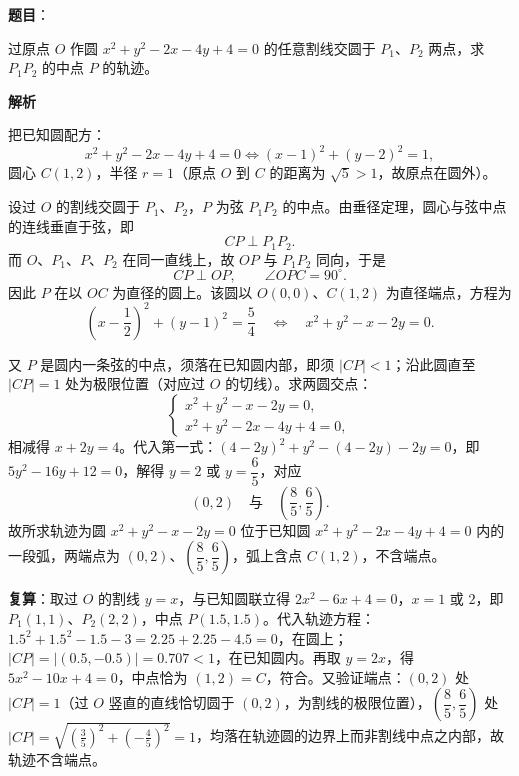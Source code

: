 \begin{answer}

\textbf{题目}：

过原点 $O$ 作圆 $x^2+y^2-2x-4y+4=0$ 的任意割线交圆于 $P_1$、$P_2$ 两点，求 $P_1P_2$ 的中点 $P$ 的轨迹。

\textbf{解析}

把已知圆配方：
\nopagebreak[4]
\[
x^2+y^2-2x-4y+4=0\iff (x-1)^2+(y-2)^2=1,
\]
圆心 $C(1,2)$，半径 $r=1$（原点 $O$ 到 $C$ 的距离为 $\sqrt5>1$，故原点在圆外）。

设过 $O$ 的割线交圆于 $P_1$、$P_2$，$P$ 为弦 $P_1P_2$ 的中点。由垂径定理，圆心与弦中点的连线垂直于弦，即
\nopagebreak[4]
\[
CP\perp P_1P_2 .
\]
而 $O$、$P_1$、$P$、$P_2$ 在同一直线上，故 $OP$ 与 $P_1P_2$ 同向，于是
\nopagebreak[4]
\[
CP\perp OP,\qquad \angle OPC=90^\circ .
\]
因此 $P$ 在以 $OC$ 为直径的圆上。该圆以 $O(0,0)$、$C(1,2)$ 为直径端点，方程为
\nopagebreak[4]
\[
\left(x-\frac12\right)^2+(y-1)^2=\frac54
\quad\iff\quad x^2+y^2-x-2y=0 .
\]

又 $P$ 是圆内一条弦的中点，须落在已知圆内部，即须 $|CP|<1$；沿此圆直至 $|CP|=1$ 处为极限位置（对应过 $O$ 的切线）。求两圆交点：
\nopagebreak[4]
\[
\begin{cases}
x^2+y^2-x-2y=0,\\
x^2+y^2-2x-4y+4=0,
\end{cases}
\]
相减得 $x+2y=4$。代入第一式：$(4-2y)^2+y^2-(4-2y)-2y=0$，即 $5y^2-16y+12=0$，解得 $y=2$ 或 $y=\dfrac65$，对应
\nopagebreak[4]
\[
(0,2)\quad\text{与}\quad\left(\frac85,\frac65\right).
\]
故所求轨迹为圆 $x^2+y^2-x-2y=0$ 位于已知圆 $x^2+y^2-2x-4y+4=0$ 内的一段弧，两端点为 $(0,2)$、$\left(\dfrac85,\dfrac65\right)$，弧上含点 $C(1,2)$，不含端点。

\textbf{复算}：取过 $O$ 的割线 $y=x$，与已知圆联立得 $2x^2-6x+4=0$，$x=1$ 或 $2$，即 $P_1(1,1)$、$P_2(2,2)$，中点 $P(1.5,1.5)$。代入轨迹方程：$1.5^2+1.5^2-1.5-3=2.25+2.25-4.5=0$，在圆上；$|CP|=|(0.5,-0.5)|=0.707<1$，在已知圆内。再取 $y=2x$，得 $5x^2-10x+4=0$，中点恰为 $(1,2)=C$，符合。又验证端点：$(0,2)$ 处 $|CP|=1$（过 $O$ 竖直的直线恰切圆于 $(0,2)$，为割线的极限位置），$\left(\dfrac85,\dfrac65\right)$ 处 $|CP|=\sqrt{\left(\frac35\right)^2+\left(-\frac45\right)^2}=1$，均落在轨迹圆的边界上而非割线中点之内部，故轨迹不含端点。


\end{answer}